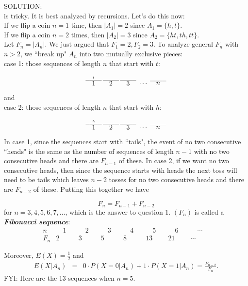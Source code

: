 \documentclass[12pt]{article}
\begin{document}
\noindent SOLUTION:\\
 is tricky. It is best analyzed by recursions.  Let's do this now:\\
If we flip a coin $n = 1$ time, then $|A_1| = 2$ since $A_1 = \{h, t\}$. \\
If we flip a coin $n = 2$ times, then $|A_2| = 3$ since $A_2 = \{ht, th, tt\}$.\\
Let $F_n = |A_n|$. We just argued that $F_1 = 2, F_2 = 3$. To analyze general $F_n$ with $n > 2$, we ``break up" $A_n$ into two mutually exclusive pieces:\\

case 1: those sequences of length $n$ that start with $t$:

$$\stackrel{\stackrel{{\large t}}{\_\_\_\_}}{{\tiny 1}}\,\stackrel{\_\_\_\_}{{\tiny 2}}\,\stackrel{\_\_\_\_}{{\tiny 3}}\,\cdots \,\stackrel{\_\_\_\_}{{\tiny n}}$$


\noindent and \\

case 2: those sequences of length $n$ that start with $h$:

$$\stackrel{\stackrel{{\large h}}{\_\_\_\_}}{{\tiny 1}}\,\stackrel{\_\_\_\_}{{\tiny 2}}\,\stackrel{\_\_\_\_}{{\tiny 3}}\,\cdots \,\stackrel{\_\_\_\_}{{\tiny n}}$$

\noindent In case 1, since the sequences start with ``tails", the event of no two consecutive ``heads" is the same as the number of sequences of length $n-1$ with no two consecutive heads and there are $F_{n-1}$ of these.  In case 2, if we want no two consecutive heads, then since the sequence starts with heads the next toss will need to be tails which leaves $n-2$ tosses for no two consecutive heads and there are $F_{n-2}$ of these. Putting this together we have

$$F_n = F_{n-1} + F_{n-2}$$
for $n = 3, 4, 5, 6, 7, \dots$, which is the answer to question 1.  $(F_n)$ is called a {\bf \em Fibonacci sequence}\label{fibonacci}:
$$
\begin{array}{c||c|c|c|c|c|c|c|c} n & \quad 1 \quad & \quad 2 \quad & \quad 3 \quad & \quad 4 \quad & \quad 5 \quad & \quad 6 \quad & \quad \cdots \quad \\ \hline
F_n & 2 & 3 & 5 & 8 & 13 & 21 & \cdots \end{array}$$


\noindent Moreover, $E(X)=\frac 12$ and
\begin{eqnarray*}
    E(X|A_n) &=& 0\cdot P(X=0|A_n)+ 1\cdot P(X = 1 | A_n) = \frac{F_{n-2}}{F_n}.
\end{eqnarray*}
FYI: Here are the 13 sequences when $n = 5$.
\end{document}

